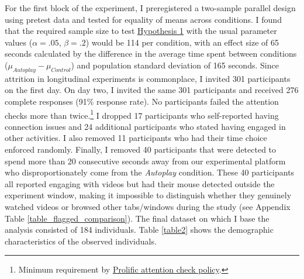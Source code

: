 \documentclass[11pt,a4paper,oneside]{article}
\begin{document}
For the first block of the experiment, I preregistered a two-sample parallel design using pretest data and tested for equality of means across conditions. I found that the required sample size to test \hyperref[hypotheses]{Hypothesis 1} with the usual parameter values ($\alpha = .05$, $\beta = .2$) would be 114 per condition, with an effect size of 65 seconds calculated by the difference in the average time spent between conditions ($\mu_{Autoplay}-\mu_{Control}$) and population standard deviation of 165 seconds. Since attrition in longitudinal experiments is commonplace, I invited 301 participants on the first day. On day two, I invited the same 301 participants and received 276 complete responses (91\% response rate). No participants failed the attention checks more than twice.\footnote{Minimum requirement by \href{https://researcher-help.prolific.co/hc/en-gb/articles/360009223553-Prolific-s-Attention-and-Comprehension-Check-Policy}{Prolific attention check policy}.} I dropped 17 participants who self-reported having connection issues and 24 additional participants who stated having engaged in other activities. I also removed 11 participants who had their time choice enforced randomly. Finally, I removed 40 participants that were detected to spend more than 20 consecutive seconds away from our experimental platform who disproportionately come from the \textit{Autoplay} condition. These 40 participants all reported engaging with videos but had their mouse detected outside the experiment window, making it impossible to distinguish whether they genuinely watched videos or browsed other tabs/windows during the study (see Appendix Table \ref{table_flagged_comparison}). The final dataset on which I base the analysis consisted of 184 individuals. Table \ref{table2} shows the demographic characteristics of the observed individuals.
\end{document}
